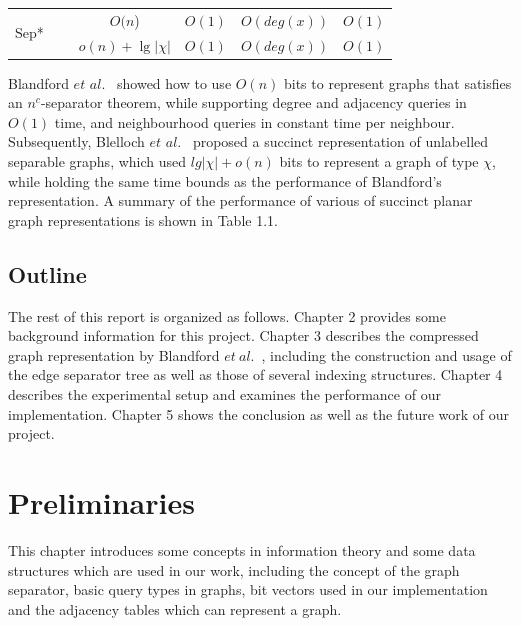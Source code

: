 \documentclass[12pt,glossary]{dalthesis}
\begin{document}
\begin{table}[ht]
\begin{tabular}{|c|c|c|c|c|c|}
\multirow{2}{*}{Sep*} &  ~\cite{compact-representation}    & $O(n$)  & $O(1)$      & $O(deg(x))$    & $O(1)$   \\ \cline{2-6} 
                           &  ~\cite{succinct-representation}    &  $o(n)+ \lg |\chi|$     & $O(1)$      & $O(deg(x))$    & $O(1)$   \\ \hline
\end{tabular}
\end{table}






\bigskip

Blandford $et$ $al.$~\cite{compact-representation} showed how to use $O(n)$ bits to represent graphs that satisfies an $n^{c}$-separator theorem, while supporting degree and adjacency queries in $O(1)$ time, and neighbourhood queries in constant time per neighbour. Subsequently, Blelloch $et$ $al.$~\cite{succinct-representation} proposed a succinct representation of unlabelled separable graphs, which used $lg| \chi |+ o(n)$ bits to represent a graph of type $\chi$, while holding the same time bounds as the performance of Blandford's representation. A summary of the performance of various of succinct planar graph representations is shown in Table 1.1.
        

\section{Outline}
The rest of this report is organized as follows. Chapter 2 provides some background information for this project. Chapter 3 describes the compressed graph representation by Blandford $et \ al.$~\cite{compact-representation}, including the construction and usage of the edge separator tree as well as those of several indexing structures. Chapter 4 describes the experimental setup and examines the performance of our implementation. Chapter 5 shows the conclusion as well as the future work of our project.


\chapter{Preliminaries}

This chapter introduces some concepts in information theory and some data structures which are used in our work, including the concept of the graph separator, basic query types in graphs, bit vectors used in our implementation and the adjacency tables which can represent a graph.
\end{document}
